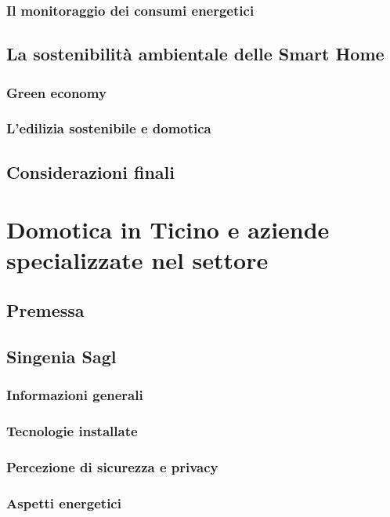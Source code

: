 \documentclass{article}
\begin{document}
\subsubsection{Il monitoraggio dei consumi energetici}

\subsection{La sostenibilità ambientale delle Smart Home}

\subsubsection{Green economy}

\subsubsection{L’edilizia sostenibile e domotica}

\subsection{Considerazioni finali}

\newpage
\section{Domotica in Ticino e aziende specializzate nel settore}

\subsection{Premessa}

\subsection{Singenia Sagl}

\subsubsection{Informazioni generali}

\subsubsection{Tecnologie installate}

\subsubsection{Percezione di sicurezza e privacy}

\subsubsection{Aspetti energetici}

\end{document}
